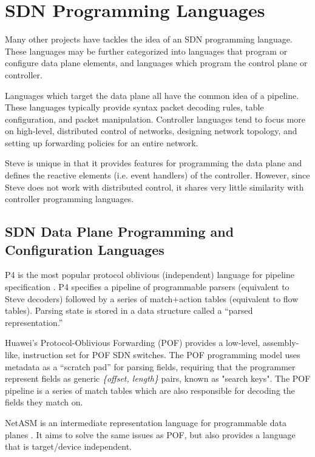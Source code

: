 \section{SDN Programming Languages}

Many other projects have tackles the idea of an SDN programming language.
These languages may be further categorized into languages that program or configure
data plane elements, and languages which program the control plane or controller.

Languages which target the data plane all have the common idea of a pipeline.
These languages typically provide syntax packet decoding rules, table configuration,
and packet manipulation.
Controller languages tend to focus more on high-level, distributed control
of networks, designing network topology, and setting up forwarding policies
for an entire network.

Steve is unique in that it provides features for programming the data plane
and defines the reactive elements (i.e. event handlers) of the controller. However, since Steve
does not work with distributed control, it shares very little similarity with 
controller programming languages.

\subsection{SDN Data Plane Programming and Configuration Languages} \label{rel:p4}

P4 is the most popular protocol oblivious (independent) language for pipeline specification
 \cite{p4_spec, p4_spec2, p42014}.
P4 specifies a pipeline of programmable parsers (equivalent to Steve decoders) followed
by a series of match+action
tables (equivalent to flow tables). Parsing state is stored in a data structure
called a ``parsed representation.''

Huawei's Protocol-Oblivious Forwarding (POF) \cite{pof_fis, pof, pof_impl} provides a
low-level, assembly-like, instruction set for POF SDN switches. 
The POF programming model uses metadata as a ``scratch pad'' for parsing fields,
requiring that the programmer represent fields as generic \textit{\{offset, length\}} pairs, 
known as "search keys". The POF pipeline is a series of match tables which are also
responsible for decoding the fields they match on.

NetASM is an intermediate representation language for programmable data planes
\cite{shahbaz2015netasm}. It aims to solve the same issues as POF, but also provides a language that is target/device independent.


